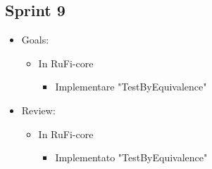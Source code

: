 \documentclass[12pt, a4paper]{article}
\begin{document}
\subsection*{Sprint 9}

\begin{itemize}
    \item Goals:
          \begin{itemize}
              \item In RuFi-core
                    \begin{itemize}
                        \item Implementare "TestByEquivalence"
                    \end{itemize}
          \end{itemize}
    \item Review:
          \begin{itemize}
              \item In RuFi-core
                    \begin{itemize}
                        \item Implementato "TestByEquivalence"
                    \end{itemize}
          \end{itemize}
\end{itemize}
\end{document}
